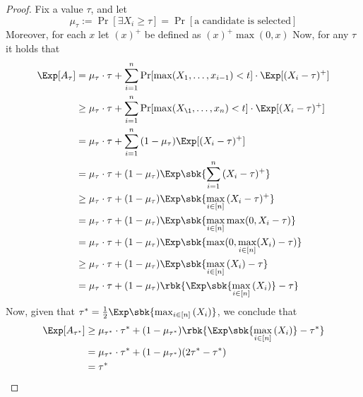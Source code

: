 \documentclass[a4paper, 12pt]{report}
\begin{document}
    \begin{proof}
        Fix a value $\tau$, and let $$\mu_\tau := \Pr[\exists X_i \ge \tau] = \Pr[\mbox{a candidate is selected}]$$ Moreover, for each $x$ let $(x)^+$ be defined as $(x)^+ \max(0, x)$ Now, for any $\tau$ it holds that
        \begin{equation*}
            \begin{split}
                \Exp[A_\tau] &= \mu_\tau \cdot \tau + \sum_{i = 1}^n{\Pr[\max(X_1, \ldots, x_{i -1 }) < t] \cdot \Exp[(X_i - \tau)^+]} \\
                             &\ge \mu_\tau \cdot \tau + \sum_{i = 1}^n{\Pr[\max(X_\1, \ldots, x_n) < t] \cdot \Exp[(X_i - \tau)^+]} \\
                             &= \mu_\tau \cdot \tau + \sum_{i = 1}^n{(1 - \mu_\tau)\Exp[(X_i - \tau)^+]} \\
                             &= \mu_\tau \cdot \tau + (1 - \mu_\tau)\Exp \sbk{\sum_{i = 1}^n{(X_i - \tau)^+}} \\
                             &\ge \mu_\tau \cdot \tau + (1 - \mu_\tau) \Exp\sbk{\max_{i \in [n]}{(X_i - \tau)^+}} \\
                             &= \mu_\tau \cdot \tau + (1 - \mu_\tau) \Exp \sbk{\max_{i \in [n]}{\max(0, X_i - \tau)}} \\
                             &= \mu_\tau \cdot \tau + (1 - \mu_\tau) \Exp \sbk{\max(0, \max_{i \in[n]}(X_i) - \tau)} \\
                             &\ge \mu_\tau \cdot \tau + (1 - \mu_\tau) \Exp \sbk {\max_{i \in [n]}{(X_i)} - \tau} \\
                             &= \mu_\tau \cdot \tau + (1 - \mu_\tau) \rbk{\Exp \sbk{\max_{i \in [n]}{(X_i)}} - \tau}
            \end{split}
        \end{equation*}
        Now, given that $\tau^* = \tfrac{1}{2} \Exp \sbk{\max_{i \in [n]}{(X_i)}}$, we conclude that
        \begin{equation*}
            \begin{split}
                \Exp[A_{\tau^*}] &\ge \mu_{\tau^*} \cdot \tau^* + (1 - \mu_{\tau^*}) \rbk{\Exp\sbk{\max_{i \in [n]}{(X_i)}} - \tau^*} \\
                                 &= \mu_{\tau ^*} \cdot \tau^* + (1 - \mu_{\tau^*}) (2 \tau^* - \tau^*) \\
                                 &= \tau^*
            \end{split}
        \end{equation*}
    \end{proof}
    
    \printbibliography %
\end{document}

